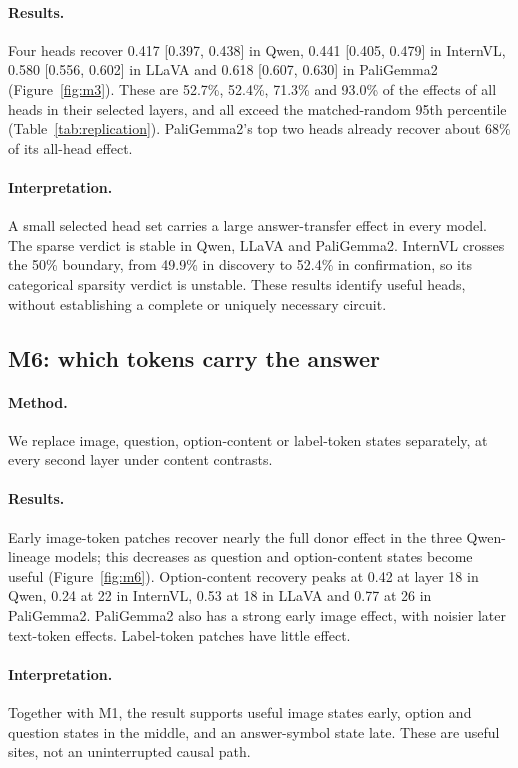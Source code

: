 \documentclass[11pt]{article}
\begin{document}
\paragraph{Results.} Four heads recover 0.417 [0.397, 0.438] in Qwen, 0.441 [0.405, 0.479] in InternVL, 0.580 [0.556, 0.602] in LLaVA and 0.618 [0.607, 0.630] in PaliGemma2 (Figure~\ref{fig:m3}). These are 52.7\%, 52.4\%, 71.3\% and 93.0\% of the effects of all heads in their selected layers, and all exceed the matched-random 95th percentile (Table~\ref{tab:replication}). PaliGemma2's top two heads already recover about 68\% of its all-head effect.

\paragraph{Interpretation.} A small selected head set carries a large answer-transfer effect in every model. The sparse verdict is stable in Qwen, LLaVA and PaliGemma2. InternVL crosses the 50\% boundary, from 49.9\% in discovery to 52.4\% in confirmation, so its categorical sparsity verdict is unstable. These results identify useful heads, without establishing a complete or uniquely necessary circuit.

\subsection{M6: which tokens carry the answer}

\paragraph{Method.} We replace image, question, option-content or label-token states separately, at every second layer under content contrasts.

\paragraph{Results.} Early image-token patches recover nearly the full donor effect in the three Qwen-lineage models; this decreases as question and option-content states become useful (Figure~\ref{fig:m6}). Option-content recovery peaks at 0.42 at layer 18 in Qwen, 0.24 at 22 in InternVL, 0.53 at 18 in LLaVA and 0.77 at 26 in PaliGemma2. PaliGemma2 also has a strong early image effect, with noisier later text-token effects. Label-token patches have little effect.

\paragraph{Interpretation.} Together with M1, the result supports useful image states early, option and question states in the middle, and an answer-symbol state late. These are useful sites, not an uninterrupted causal path.
\end{document}
